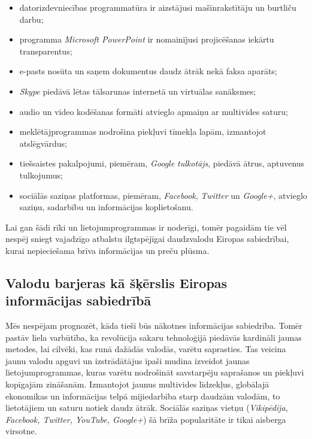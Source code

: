\begin{multicols}{2}
\begin{itemize}
\item  datorizdevniecības programmatūra ir aizstājusi mašīnrakstītāju un burtliču darbu;
\item  programma \textit{Microsoft PowerPoint} ir nomainījusi projicēšanas iekārtu transparentus;
\item  e-pasts nosūta un saņem dokumentus daudz ātrāk nekā faksa aparāts;
\item  \textit{Skype} piedāvā lētas tālsarunas internetā un virtuālas sanāksmes;
\item  audio un video kodēšanas formāti atvieglo apmaiņu ar multivides saturu;
\item  meklētājprogrammas nodrošina piekļuvi tīmekļa lapām, izmantojot atslēgvārdus;
\item  tiešsaistes pakalpojumi, piemēram, \textit{Google tulkotājs}, piedāvā ātrus, aptuvenus tulkojumus;
\item  sociālās saziņas platformas, piemēram, \textit{Facebook}, \textit{Twitter} un \textit{Google+}, atvieglo saziņu, sadarbību un informācijas koplietošanu.
\end{itemize}

Lai gan šādi rīki un lietojumprogrammas ir noderīgi, tomēr pagaidām tie vēl nespēj sniegt vajadzīgo atbalstu ilgtspējīgai daudzvalodu Eiropas sabiedrībai, kurai nepieciešama brīva informācijas un preču plūsma.

\subsection{Valodu barjeras kā šķērslis Eiropas informācijas sabiedrībā}

Mēs nespējam prognozēt, kāda tieši būs nākotnes informācijas sabiedrība. 
Tomēr pastāv liela varbūtība, ka revolūcija sakaru tehnoloģijā piedāvās kardināli jaunas metodes, lai cilvēki, kas runā dažādās valodās, varētu saprasties. 
Tas veicina jaunu valodu apguvi un izstrādātājus īpaši mudina izveidot jaunas lietojumprogrammas, kuras varētu nodrošināt savstarpēju saprašanos un piekļuvi kopīgajām zināšanām. 
Izmantojot jaunus multivides līdzekļus, globālajā ekonomikas un informācijas telpā mijiedarbība starp daudzām valodām, to lietotājiem un saturu notiek daudz ātrāk. 
Sociālās saziņas vietņu (\textit{Vikipēdija, Facebook, Twitter, YouTube, Google+}) šā brīža popularitāte ir tikai aisberga virsotne.


\end{multicols}

